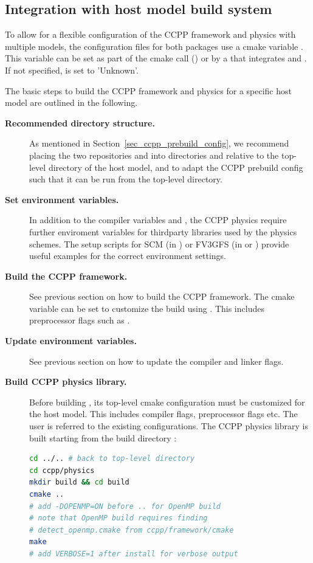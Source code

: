 \subsection{Integration with host model build system}
To allow for a flexible configuration of the CCPP framework and physics with multiple models, the  configuration files for both packages use a cmake variable . This variable can be set as part of the cmake call () or by a  that integrates  and . If not specified,  is set to 'Unknown'.

The basic steps to build the CCPP framework and physics for a specific host model are outlined in the following.
\begin{description}
\item[\textbf{Recommended directory structure.}] As mentioned in Section~\ref{sec_ccpp_prebuild_config}, we recommend placing the two repositories  and  into directories  and  relative to the top-level directory of the host model, and to adapt the CCPP prebuild config such that it can be run from the top-level directory.
\item[\textbf{Set environment variables.}] In addition to the compiler variables  and , the CCPP physics require further enviroment variables for thirdparty libraries used by the physics schemes. The setup scripts for SCM (in ) or FV3GFS (in  or ) provide useful examples for the correct environment settings.
\item[\textbf{Build the CCPP framework.}] See previous section on how to build the CCPP framework. The cmake variable  can be set to customize the build using . This includes preprocessor flags such as .
\item[\textbf{Update environment variables.}] See previous section on how to update the compiler and linker flags.
\item[\textbf{Build CCPP physics library.}] Before building , its top-level cmake configuration  must be customized for the host model. This includes compiler flags, preprocessor flags etc. The user is referred to the existing configurations. The CCPP physics library is built starting from the build directory :
\begin{lstlisting}[language=bash]
cd ../.. # back to top-level directory
cd ccpp/physics
mkdir build && cd build
cmake ..
# add -DOPENMP=ON before .. for OpenMP build
# note that OpenMP build requires finding
# detect_openmp.cmake from ccpp/framework/cmake
make
# add VERBOSE=1 after install for verbose output
\end{lstlisting}
\end{description}
